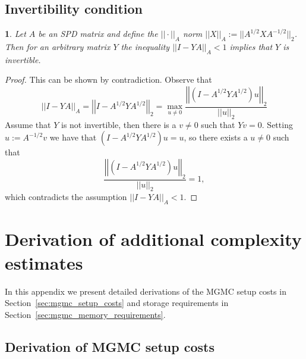 \documentclass[11pt,english]{article}
\theoremstyle{plain}
\theoremstyle{plain}
\theoremstyle{plain}
\newtheorem{lem}[thm]{\protect\lemmaname}
\theoremstyle{plain}
\numberwithin{equation}{section}
\newcommand*{\id}{I}
\newcommand{\rev}[1]{#1}
\providecommand{\lemmaname}{Lemma}
\begin{document}
\subsection{Invertibility condition}\label{sec:Y-invertible}
\begin{lem}\label{lem:Y-invertible}
	Let $A$ be an SPD matrix and define the $||\cdot||_{A}$ norm $||X||_{A}:=||A^{1/2}XA^{-1/2}||_{2}$. Then for an arbitrary matrix $Y$ the inequality $||\id-YA||_{A}<1$ implies that $Y$ is invertible.
\end{lem}
\begin{proof}
	This can be shown by contradiction. Observe that
	\begin{equation}
		||\id-YA||_{A}=\left|\left|\id-A^{1/2}YA^{1/2}\right|\right|_{2}=\max_{u\ne0}\frac{\left|\left|(\id-A^{1/2}YA^{1/2})u\right|\right|_{2}}{||u||_{2}}\label{eqn:X_norm_bound}
	\end{equation}
	Assume that $Y$ is not invertible, then there is a $v\ne0$ such
	that $Yv=0$. Setting $u:=A^{-1/2}v$ we have that $(\id-A^{1/2}YA^{1/2})u=u$,
	so there exists a $u\ne0$ such that
	\begin{equation}
		\frac{\left|\left|(\id-A^{1/2}YA^{1/2})u\right|\right|_{2}}{||u||_{2}}=1,
	\end{equation}
	which contradicts the assumption $||\id-YA||_{A}<1$.
\end{proof}
\rev{\section{Derivation of additional complexity estimates}}
\rev{In this appendix we present detailed derivations of the MGMC setup costs in Section~\ref{sec:mgmc_setup_costs} and storage requirements in Section~\ref{sec:mgmc_memory_requirements}.}
\rev{\subsection{Derivation of MGMC setup costs}\label{sec:proof_mgmc_setup_costs}}
\end{document}

